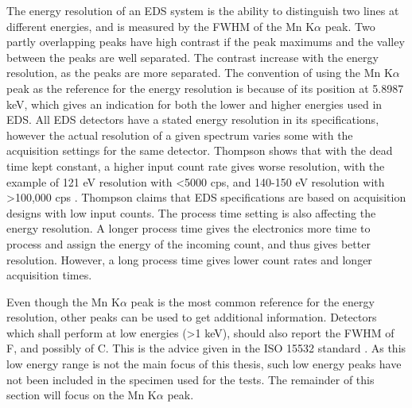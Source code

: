 The energy resolution of an EDS system is the ability to distinguish two lines at different energies, and is measured by the FWHM of the Mn K$\alpha$ peak.
Two partly overlapping peaks have high contrast if the peak maximums and the valley between the peaks are well separated.
The contrast increase with the energy resolution, as the peaks are more separated.
The convention of using the Mn K$\alpha$ peak as the reference for the energy resolution is because of its position at 5.8987 keV, which gives an indication for both the lower and higher energies used in EDS.
All EDS detectors have a stated energy resolution in its specifications, however the actual resolution of a given spectrum varies some with the acquisition settings for the same detector.
Thompson shows that with the dead time kept constant, a higher input count rate gives worse resolution, with the example of 121 eV resolution with <5000 cps, and 140-150 eV resolution with >100,000 cps \cite{keith_energy_res_2013}.
Thompson claims that EDS specifications are based on acquisition designs with low input counts.
The process time setting is also affecting the energy resolution.
A longer process time gives the electronics more time to process and assign the energy of the incoming count, and thus gives better resolution.
However, a long process time gives lower count rates and longer acquisition times.


Even though the Mn K$\alpha$ peak is the most common reference for the energy resolution, other peaks can be used to get additional information.
Detectors which shall perform at low energies (>1 keV), should also report the FWHM of F, and possibly of C.
This is the advice given in the ISO 15532 standard \cite{iso_qc_15632}.
As this low energy range is not the main focus of this thesis, such low energy peaks have not been included in the specimen used for the tests.
The remainder of this section will focus on the Mn K$\alpha$ peak.



